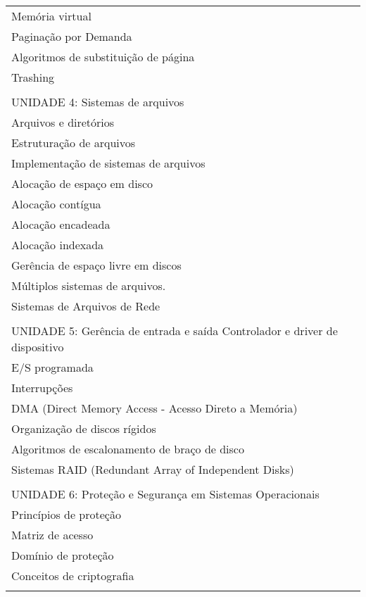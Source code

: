\documentclass[12pt]{article}
\begin{document}
\begin{longtable}{|L{1.025\textwidth}|}
Memória virtual\\
Paginação por Demanda\\
Algoritmos de substituição de página\\
Trashing\\
\\
UNIDADE 4: Sistemas de arquivos \\%
Arquivos e diretórios\\
Estruturação de arquivos\\
Implementação de sistemas de arquivos\\
Alocação de espaço em disco\\
Alocação contígua\\
Alocação encadeada\\
Alocação indexada\\
Gerência de espaço livre em discos\\
Múltiplos sistemas de arquivos.\\
Sistemas de Arquivos de Rede\\
\\
UNIDADE 5: Gerência de entrada e saída %
Controlador e driver de dispositivo\\
E/S programada\\
Interrupções\\
DMA (Direct Memory Access - Acesso Direto a Memória)\\
Organização de discos rígidos\\
Algoritmos de escalonamento de braço de disco		\\
Sistemas RAID (Redundant Array of Independent Disks)\\
\\
UNIDADE 6: Proteção e Segurança em Sistemas Operacionais \\%
Princípios de proteção\\
Matriz de acesso\\
Domínio de proteção\\
Conceitos de criptografia\\
\\ \hline
\end{longtable} 

\newpage
\end{document}
